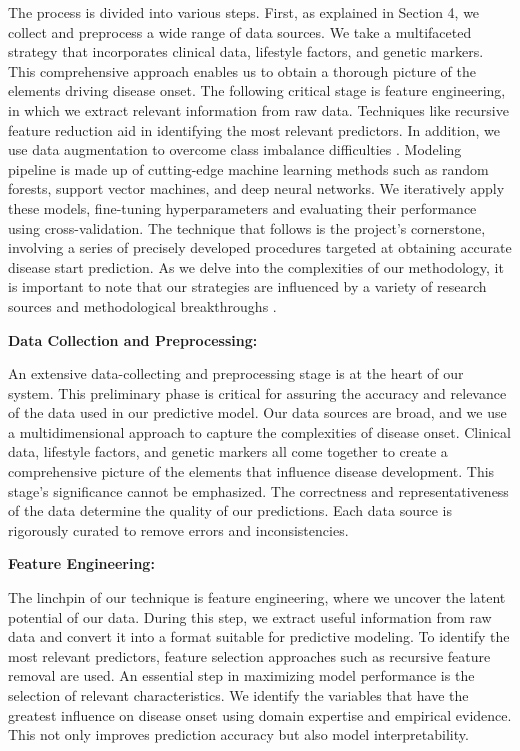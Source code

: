 \documentclass[manuscript,screen,]{acmart}
\begin{document}
The process is divided into various steps. First, as explained in Section 4, we collect and preprocess a wide range of data sources. We take a multifaceted strategy that incorporates clinical data, lifestyle factors, and genetic markers. This comprehensive approach enables us to obtain a thorough picture of the elements driving disease onset.
The following critical stage is feature engineering, in which we extract relevant information from raw data. Techniques like recursive feature reduction \cite{SharmaDey2012} aid in identifying the most relevant predictors. In addition, we use data augmentation to overcome class imbalance difficulties \cite{johnson2019survey}.
Modeling pipeline is made up of cutting-edge machine learning methods such as random forests, support vector machines, and deep neural networks. We iteratively apply these models, fine-tuning hyperparameters and evaluating their performance using cross-validation.
The technique that follows is the project's cornerstone, involving a series of precisely developed procedures targeted at obtaining accurate disease start prediction. As we delve into the complexities of our methodology, it is important to note that our strategies are influenced by a variety of research sources and methodological breakthroughs \cite{Thompson2021DiseasePrediction}.

\textbf{Data Collection and Preprocessing:}	

    An extensive data-collecting and preprocessing stage is at the heart of our system. This preliminary phase is critical for assuring the accuracy and relevance of the data used in our predictive model. Our data sources are broad, and we use a multidimensional approach to capture the complexities of disease onset. Clinical data, lifestyle factors, and genetic markers all come together to create a comprehensive picture of the elements that influence disease development. 
This stage's significance cannot be emphasized. The correctness and representativeness of the data determine the quality of our predictions. Each data source is rigorously curated to remove errors and inconsistencies.

\textbf{Feature Engineering:}

    The linchpin of our technique is feature engineering, where we uncover the latent potential of our data. During this step, we extract useful information from raw data and convert it into a format suitable for predictive modeling. To identify the most relevant predictors, feature selection approaches such as recursive feature removal \cite{SharmaDey2012} are used.
An essential step in maximizing model performance is the selection of relevant characteristics. We identify the variables that have the greatest influence on disease onset using domain expertise and empirical evidence. This not only improves prediction accuracy but also model interpretability.
\end{document}
